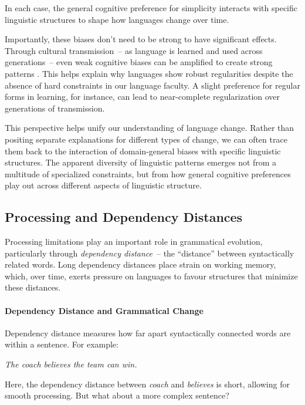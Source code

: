 In each case, the general cognitive preference for simplicity interacts with specific linguistic structures to shape how languages change over time.

Importantly, these biases don't need to be strong to have significant effects. Through cultural transmission~-- as language is learned and used across generations~-- even weak cognitive biases can be amplified to create strong patterns \citep{culbertson2016simplicity}. This helps explain why languages show robust regularities despite the absence of hard constraints in our language faculty. A slight preference for regular forms in learning, for instance, can lead to near-complete regularization over generations of transmission.

This perspective helps unify our understanding of language change. Rather than positing separate explanations for different types of change, we can often trace them back to the interaction of domain-general biases with specific linguistic structures. The apparent diversity of linguistic patterns emerges not from a multitude of specialized constraints, but from how general cognitive preferences play out across different aspects of linguistic structure.

\subsection{Processing and Dependency Distances}

Processing limitations play an important role in grammatical evolution, particularly through \textit{dependency distance}~-- the ``distance'' between syntactically related words. Long dependency distances place strain on working memory, which, over time, exerts pressure on languages to favour structures that minimize these distances.

\paragraph*{Dependency Distance and Grammatical Change}

Dependency distance measures how far apart syntactically connected words are within a sentence. For example:

\ea
\textit{The coach believes the team can win.}
\z

Here, the dependency distance between \textit{coach} and \textit{believes} is short, allowing for smooth processing. But what about a more complex sentence?

